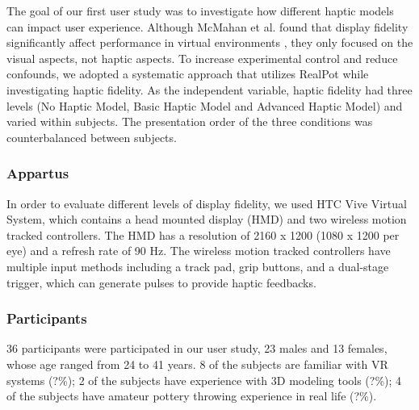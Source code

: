 \documentclass{svjour3}                     %
\begin{document}
The goal of our first user study was to investigate how different haptic models can impact user experience. 
%
Although McMahan et al. found that display fidelity significantly affect performance in virtual environments \cite{mcmahan2012evaluating}, they only focused on the visual aspects, not haptic aspects.
%
To increase experimental control and reduce confounds, we adopted a systematic approach that utilizes RealPot while investigating haptic fidelity.
%
As the independent variable, haptic fidelity had three levels (No Haptic Model, Basic Haptic Model and Advanced Haptic Model) and varied within subjects.
%
The presentation order of the three conditions was counterbalanced between subjects.











\subsubsection{Appartus}
In order to evaluate different levels of display fidelity, we used HTC Vive Virtual System, which contains a head mounted display (HMD) and two wireless motion tracked controllers.
The HMD has a resolution of 2160 x 1200 (1080 x 1200 per eye) and a refresh rate of 90 Hz.
The wireless motion tracked controllers have multiple input methods including a track pad, grip buttons, and a dual-stage trigger, which can generate pulses to provide haptic feedbacks.










\subsubsection{Participants}
36 participants were participated in our user study, 23 males and 13 females, whose age ranged from 24 to 41 years. 8 of the subjects are familiar with VR systems (?\%); 2 of the subjects have experience with 3D modeling tools (?\%); 4 of the subjects have amateur pottery throwing experience in real life (?\%).
\end{document}
